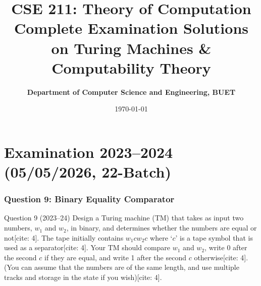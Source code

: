 \documentclass[11pt,a4paper]{article}
\title{\textbf{\color{buetblue}CSE 211: Theory of Computation}\\
\large Complete Examination Solutions on Turing Machines \& Computability Theory}
\author{\textbf{Department of Computer Science and Engineering, BUET}}
\date{\today}
\begin{document}
\maketitle
\tableofcontents
\newpage

\part{Examination 2023--2024 (05/05/2026, 22-Batch)}

\section{Question 9: Binary Equality Comparator}
\begin{questionbox}{Question 9 (2023--24)}
Design a Turing machine (TM) that takes as input two numbers, $w_1$ and $w_2$, in binary, and determines whether the numbers are equal or not[cite: 4]. The tape initially contains $w_1 c w_2 c$ where `$c$' is a tape symbol that is used as a separator[cite: 4]. Your TM should compare $w_1$ and $w_2$, write 0 after the second $c$ if they are equal, and write 1 after the second $c$ otherwise[cite: 4]. (You can assume that the numbers are of the same length, and use multiple tracks and storage in the state if you wish)[cite: 4].
\end{questionbox}
\end{document}
